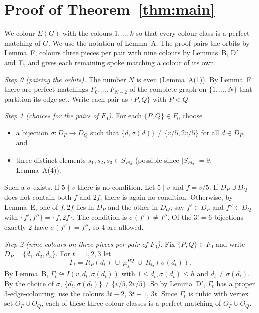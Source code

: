 \documentclass[11pt]{amsart}
\theoremstyle{plain}
\theoremstyle{definition}
\theoremstyle{remark}
\numberwithin{equation}{section}
\newcommand{\abs}[1]{\lvert #1\rvert}
\begin{document}
\section{Proof of Theorem~\ref{thm:main}}\label{sec:proof}

We colour \(E(G)\) with the colours \(1,\dots,k\) so that every colour class is a perfect matching of \(G\). We use the notation of Lemma~A. The proof pairs the orbits by Lemma~F, colours three pieces per pair with nine colours by Lemmas~B, D\('\) and~E, and gives each remaining spoke matching a colour of its own.

\emph{Step 0 (pairing the orbits).} The number \(N\) is even (Lemma~A(1)). By Lemma~F there are perfect matchings \(F_0,\dots,F_{N-2}\) of the complete graph on \(\{1,\dots,N\}\) that partition its edge set. Write each pair as \(\{P,Q\}\) with \(P<Q\).

\emph{Step 1 (choices for the pairs of \(F_0\)).} For each \(\{P,Q\}\in F_0\) choose
\begin{itemize}
\item a bijection \(\sigma:D_P\to D_Q\) such that \(\{d,\sigma(d)\}\ne\{v/5,2v/5\}\) for all \(d\in D_P\), and
\item three distinct elements \(s_1,s_2,s_3\in S_{PQ}\) (possible since \(\abs{S_{PQ}}=9\), Lemma~A(4)).
\end{itemize}
Such a \(\sigma\) exists. If \(5\nmid v\) there is no condition. Let \(5\mid v\) and \(f=v/5\). If \(D_P\cup D_Q\) does not contain both \(f\) and \(2f\), there is again no condition. Otherwise, by Lemma~E, one of \(f,2f\) lies in \(D_P\) and the other in \(D_Q\); say \(f'\in D_P\) and \(f''\in D_Q\) with \(\{f',f''\}=\{f,2f\}\). The condition is \(\sigma(f')\ne f''\). Of the \(3!=6\) bijections exactly \(2\) have \(\sigma(f')=f''\), so \(4\) are allowed.

\emph{Step 2 (nine colours on three pieces per pair of \(F_0\)).} Fix \(\{P,Q\}\in F_0\) and write \(D_P=\{d_1,d_2,d_3\}\). For \(t=1,2,3\) let
\[
\Gamma_t=R_P(d_t)\ \cup\ \mu^{PQ}_{s_t}\ \cup\ R_Q(\sigma(d_t)).
\]
By Lemma~B, \(\Gamma_t\cong I(v,d_t,\sigma(d_t))\) with \(1\le d_t,\sigma(d_t)\le h\) and \(d_t\ne\sigma(d_t)\). By the choice of \(\sigma\), \(\{d_t,\sigma(d_t)\}\ne\{v/5,2v/5\}\). So by Lemma~D\('\), \(\Gamma_t\) has a proper \(3\)-edge-colouring; use the colours \(3t-2\), \(3t-1\), \(3t\). Since \(\Gamma_t\) is cubic with vertex set \(O_P\cup O_Q\), each of these three colour classes is a perfect matching of \(O_P\cup O_Q\).
\end{document}
